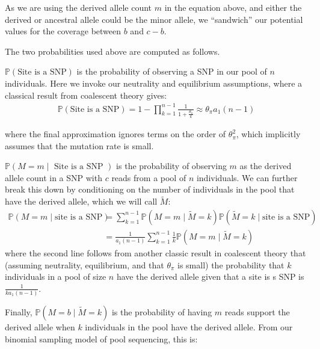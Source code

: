 \documentclass[a4paper,fontsize=9pt,DIV=14]{scrartcl}
\newcommand{\samplesize}{n}
\newcommand{\coverage}{c}
\begin{document}
As we are using the derived allele count $m$ in the equation above,
and either the derived or ancestral allele could be the minor allele,
we ``sandwich'' our potential values for the coverage between $b$ and $\coverage-b$.

The two probabilities used above are computed as follows.

$\mathbb{P}\left(\text{Site is a SNP}\right)$ is the probability of observing a SNP in our pool of $\samplesize$ individuals.  Here we invoke our neutrality and equilibrium assumptions, where a classical result from coalescent theory gives:
%
\begin{align}
\label{eq:PSNP}
\mathbb{P}\left(\text{Site is a SNP}\right) = 1- \prod_{k=1}^{\samplesize-1} \frac{1}{1+\frac{\theta_\pi}{k}} \approx \theta_\pi a_1(n-1)
\end{align}

where the final approximation ignores terms on the order of  $\theta_\pi^2$, which implicitly assumes that the mutation rate is small.

$\mathbb{P}\left(M = m \mid \text{ Site is a SNP }\right)$ is the probability of observing $m$ as the derived allele count in a SNP with $\coverage$ reads from a pool of $n$ individuals.  We can further break this down by conditioning on the number of individuals in the pool that have the derived allele, which we will call $\widetilde{M}$:
%
\begin{align}
    \label{eq:Pmcn}
    \mathbb{P}\left(M = m \mid \text{site is a SNP}\right) &= \sum_{k=1}^{n-1} \mathbb{P}\left(M=m \mid \widetilde{M} = k\right)\mathbb{P} \left( \widetilde{M} = k \mid \text{site is a SNP}\right)\\
    &= \frac{1}{a_1(n-1)}  \sum_{k=1}^{n-1} \frac{1}{k}  \mathbb{P}\left(M=m \mid\widetilde{M} = k\right)
\end{align}
where the second line follows from another classic result in coalescent theory that (assuming neutrality, equilibrium, and that $\theta_\pi$ is small) the probability that $k$ individuals in a pool of size $\samplesize$ have the derived allele given that a site is s SNP is $\frac{1}{ka_1(n-1)}$.

Finally, $ \mathbb{P}\left(M=b \mid \widetilde{M} = k\right)$ is the probability of having $m$ reads support the derived allele when $k$ individuals in the pool have the derived allele.  From our binomial sampling model of pool sequencing, this is:
\end{document}
